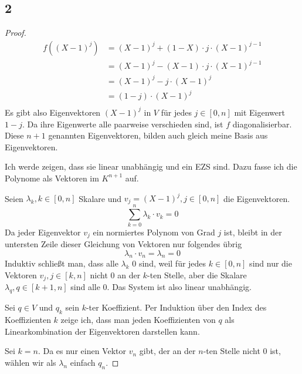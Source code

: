 \documentclass[10pt,a4paper]{article}
\begin{document}
\subsection*{2}

\begin{proof}
\begin{align*}
f \left( (X - 1)^{j} \right) & = (X - 1)^{j} + (1 - X) \cdot j \cdot (X - 1)^{j - 1}\\
& = (X - 1)^{j} - (X - 1) \cdot j \cdot (X - 1)^{j - 1}\\
& = (X - 1)^{j} - j \cdot (X - 1)^{j}\\
& = (1 - j) \cdot (X - 1)^{j}\\
\end{align*}
Es gibt also Eigenvektoren $(X - 1)^{j}$ in $V$ für jedes $j \in [0, n]$ mit Eigenwert $1 - j$.
Da ihre Eigenwerte alle paarweise verschieden sind, ist $f$ diagonalisierbar.
Diese $n + 1$ genannten Eigenvektoren, bilden auch gleich meine Basis aus Eigenvektoren.

Ich werde zeigen, dass sie linear unabhängig und ein EZS sind.
Dazu fasse ich die Polynome als Vektoren im $K^{n + 1}$ auf.

Seien $\lambda_{k}, k \in [0, n]$ Skalare und $v_{j} = (X - 1)^{j}, j \in [0, n]$ die Eigenvektoren.
\begin{equation}
\sum_{k = 0}^{n} \lambda_{k} \cdot v_{k} = 0
\end{equation}
Da jeder Eigenvektor $v_{j}$ ein normiertes Polynom von Grad $j$ ist, bleibt in der untersten Zeile dieser Gleichung von Vektoren nur folgendes übrig
\begin{equation}
\lambda_{n} \cdot v_{n} = \lambda_{n} = 0
\end{equation}
Induktiv schließt man, dass alle $\lambda_{k}$ $0$ sind, weil für jedes $k \in [0, n]$ sind nur die Vektoren $v_{j}, j \in [k, n]$ nicht $0$ an der $k$-ten Stelle, aber die Skalare $\lambda_{q}, q \in [k + 1, n]$ sind alle $0$.
Das System ist also linear unabhängig.

Sei $q \in V$ und $q_{k}$ sein $k$-ter Koeffizient.
Per Induktion über den Index des Koeffizienten $k$ zeige ich, dass man jeden Koeffizienten von $q$ als Linearkombination der Eigenvektoren darstellen kann.

Sei $k = n$.
Da es nur einen Vektor $v_{n}$ gibt, der an der $n$-ten Stelle nicht $0$ ist, wählen wir als $\lambda_{n}$ einfach $q_{n}$.


\end{proof}
\end{document}
